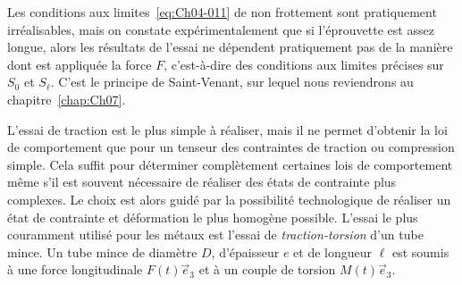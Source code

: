 Les conditions aux limites~\eqref{eq:Ch04-011} de non frottement sont pratiquement irréalisables, mais on constate expérimentalement que si l'éprouvette est assez longue, alors les résultats de l'essai ne dépendent pratiquement pas de la manière dont est appliquée la force $F$, c'est-à-dire des conditions aux limites précises sur $S_0$ et $S_\ell$.
C'est le principe de Saint-Venant, sur lequel nous reviendrons au chapitre~\ref{chap:Ch07}.

L'essai de traction est le plus simple à réaliser, mais il ne permet d'obtenir la loi de comportement que pour un tenseur des contraintes de traction ou compression simple.
Cela suffit pour déterminer complètement certaines lois de comportement même s'il est souvent nécessaire de réaliser des états de contrainte plus complexes.
Le choix est alors guidé par la possibilité technologique de réaliser un état de contrainte et déformation le plus homogène possible.
L'essai le plus couramment utilisé pour les métaux est l'essai de \emph{traction-torsion} d'un tube mince.
Un tube mince de diamètre $D$, d'épaisseur $e$ et de longueur $\ell$ est soumis à une force longitudinale $F(t) \vec{e}_3$ et à un couple de torsion $M(t) \vec{e}_3$.

